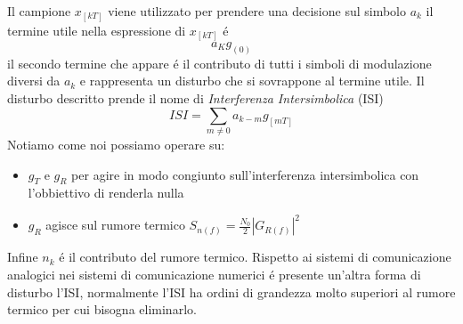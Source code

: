 \begin{itemize}
{\[                    \]
                    Il campione $x_{[kT]}$ viene utilizzato per prendere una decisione sul simbolo $a_k$ il termine utile nella espressione di $x_{[kT]}$
                    é 
                    \[
                        a_Kg_{(0)}
                    \]\label{ISI}
                    il secondo termine che appare é il contributo di tutti i simboli di modulazione diversi da $a_k$ e rappresenta un disturbo che si 
                    sovrappone al termine utile. Il disturbo descritto prende il nome di \emph{Interferenza Intersimbolica} (ISI)
                    \[
                        ISI =  \sum_{m\neq 0}a_{k-m}g_{[mT]}
                    \]
                    Notiamo come noi possiamo operare su:
                    \begin{itemize}
                        \item {
                            $g_T$ e $g_R$ per agire in modo congiunto sull'interferenza intersimbolica con l'obbiettivo di renderla nulla
                        }
                        \item {
                            $g_R$ agisce sul rumore termico $S_{n(f)} = \frac{N_0}{2} \left|G_{R(f)}\right|^2$
                        }
                    \end{itemize}
                    Infine $n_k$ é il contributo del rumore termico. Rispetto ai sistemi di comunicazione analogici nei sistemi di comunicazione numerici
                    é presente un'altra forma di disturbo l'ISI, normalmente l'ISI ha ordini di grandezza molto superiori al rumore termico per cui bisogna 
                    eliminarlo.
                }
            \end{itemize}
